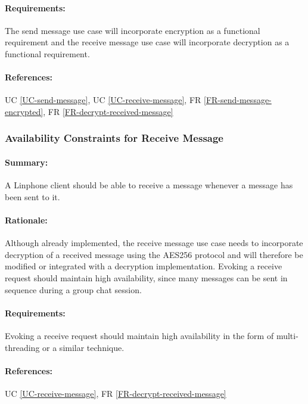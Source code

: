 \documentclass[11pt]{article}
\begin{document}
\paragraph{Requirements:} The send message use case will incorporate encryption as a functional requirement and the receive message use case will incorporate decryption as a functional requirement.
\paragraph{References:} UC \ref{UC-send-message}, UC \ref{UC-receive-message}, FR \ref{FR-send-message-encrypted}, FR \ref{FR-decrypt-received-message}

\subsubsection{Availability Constraints for Receive Message} \label{NFR-availability-receive-message}
\paragraph{Summary:} A Linphone client should be able to receive a message whenever a message has been sent to it.
\paragraph{Rationale:} Although already implemented, the receive message use case needs to incorporate decryption of a received message using the AES256 protocol and will therefore be modified or integrated with a decryption implementation. Evoking a receive request should maintain high availability, since many messages can be sent in sequence during a group chat session.
\paragraph{Requirements:} Evoking a receive request should maintain high availability in the form of multi-threading or a similar technique.
\paragraph{References:} UC \ref{UC-receive-message}, FR \ref{FR-decrypt-received-message}


%
%
\end{document}
